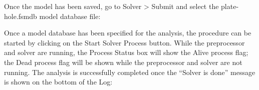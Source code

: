 \documentclass[
    11pt,        %
    a4paper,     %
    final,       %
    fleqn,       %
    notitlepage, %
    onecolumn,   %
    oneside,     %
]{article}
\begin{document}
Once the model has been saved, go to Solver > Submit and select the plate-hole.fs\textunderscore mdb model database file:
\begin{center}
\end{center}

Once a model database has been specified for the analysis, the procedure can be started by clicking on the Start Solver Process button. While the preprocessor and solver are running, the Process Status box will show the Alive process flag; the Dead process flag will be shown while the preprocessor and solver are not running. The analysis is successfully completed once the ``Solver is done'' message is shown on the bottom of the Log:
\begin{center}
\end{center}
\end{document}
